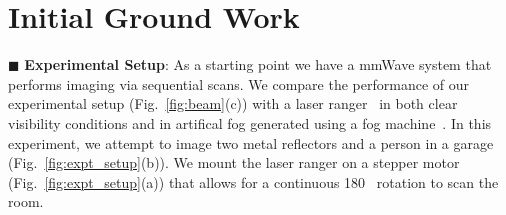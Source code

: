 

\vspace{-4mm}
\section{Initial Ground Work}
\vspace{-2mm}

\iffalse
\begin{figure*}
	\centering
	\texttt{[image: ../Photos/experiments.pdf]}
	\caption{Experiments with fog}
	\label{fig:expt_setup}
\end{figure*}
\fi

\noindent $\blacksquare$ \textbf{Experimental Setup}: As a starting point we have a mmWave system that performs imaging via sequential scans. We compare the performance of our experimental setup (Fig.~\ref{fig:beam}(c)) with a laser ranger~\cite{laser_ranger} in both clear visibility conditions and in artifical fog generated using a fog machine~\cite{fog_machine}.
In this experiment, we attempt to image two metal reflectors and a person in a garage (Fig.~\ref{fig:expt_setup}(b)). We mount the laser ranger on a stepper motor (Fig.~\ref{fig:expt_setup}(a)) that allows for a continuous 180\textdegree~ rotation to scan the room.











